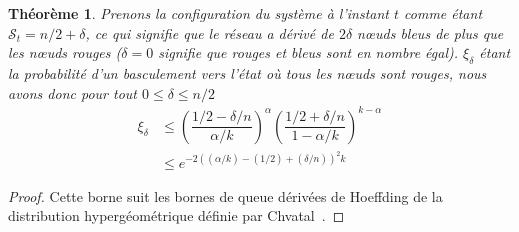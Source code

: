 \documentclass[letterpaper,twocolumn,10pt]{article}
\newtheorem{theorem}{Théorème}
\theoremstyle{definition}
\begin{document}

\begin{theorem}
Prenons la configuration du système à l'instant $t$ comme étant $\mathcal{S}_t = n/2 + \delta$, ce qui signifie que le
réseau a dérivé de $2\delta$ nœuds bleus de plus que les nœuds rouges ($\delta = 0$ signifie que rouges et bleus
sont en nombre égal). $\xi_\delta$ étant la probabilité d'un basculement vers l'état où tous les nœuds sont rouges,
nous avons donc pour tout $0 \leq \delta \leq n/2$
\begin{equation}
\begin{split}
    \xi_\delta &\leq \left(\dfrac{1/2 - \delta/n}{\alpha/k}\right)^{\alpha}\left(\dfrac{1/2 + \delta/n}{1- \alpha/k}\right)^{k-\alpha}\\
    &\leq e^{-2((\alpha/k) - (1/2) + (\delta/n))^2 k}
\end{split}
\end{equation}
\end{theorem}

\begin{proof}
Cette borne suit les bornes de queue dérivées de Hoeffding de la distribution hypergéométrique définie par
Chvatal~\cite{chvatal1979tail}.
\end{proof}

\end{document}
